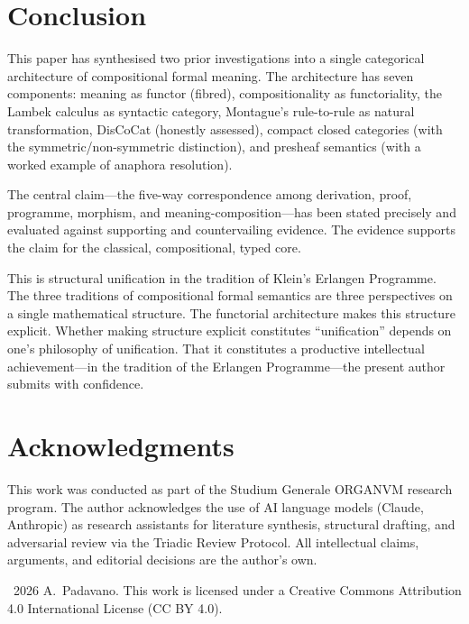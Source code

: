 \documentclass[12pt,a4paper]{article}
\begin{document}
\section{Conclusion}

This paper has synthesised two prior investigations into a single categorical
architecture of compositional formal meaning. The architecture has seven
components: meaning as functor (fibred), compositionality as functoriality,
the Lambek calculus as syntactic category, Montague's rule-to-rule as natural
transformation, DisCoCat (honestly assessed), compact closed categories (with
the symmetric/non-symmetric distinction), and presheaf semantics (with a
worked example of anaphora resolution).

The central claim---the five-way correspondence among derivation, proof,
programme, morphism, and meaning-composition---has been stated precisely and
evaluated against supporting and countervailing evidence. The evidence
supports the claim for the classical, compositional, typed core.

This is structural unification in the tradition of Klein's Erlangen Programme.
The three traditions of compositional formal semantics are three perspectives
on a single mathematical structure. The functorial architecture makes this
structure explicit. Whether making structure explicit constitutes
``unification'' depends on one's philosophy of unification. That it
constitutes a productive intellectual achievement---in the tradition of the
Erlangen Programme---the present author submits with confidence.

\section*{Acknowledgments}

This work was conducted as part of the Studium Generale ORGANVM research
program. The author acknowledges the use of AI language models (Claude,
Anthropic) as research assistants for literature synthesis, structural
drafting, and adversarial review via the Triadic Review Protocol. All
intellectual claims, arguments, and editorial decisions are the author's own.

\medskip
\noindent\textcopyright~2026 A.~Padavano. This work is licensed under a
Creative Commons Attribution 4.0 International License (CC BY 4.0).
\end{document}
